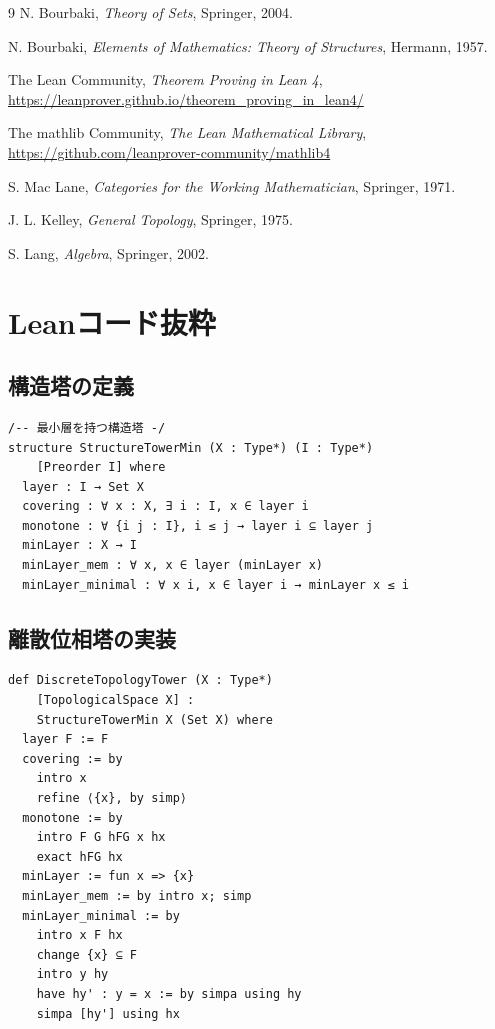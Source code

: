 \documentclass[a4paper,11pt,ja=standard]{bxjsarticle}
\theoremstyle{definition}
\begin{document}
\begin{thebibliography}{9}
N. Bourbaki, \textit{Theory of Sets}, Springer, 2004.

N. Bourbaki, \textit{Elements of Mathematics: Theory of Structures},
Hermann, 1957.

The Lean Community, \textit{Theorem Proving in Lean 4},
\url{https://leanprover.github.io/theorem_proving_in_lean4/}

The mathlib Community, \textit{The Lean Mathematical Library},
\url{https://github.com/leanprover-community/mathlib4}

S. Mac Lane, \textit{Categories for the Working Mathematician},
Springer, 1971.

J. L. Kelley, \textit{General Topology},
Springer, 1975.

S. Lang, \textit{Algebra},
Springer, 2002.
\end{thebibliography}

\appendix
\section{Leanコード抜粋}

\subsection{構造塔の定義}

\begin{lstlisting}[style=leanstyle, caption=構造塔の基本定義]
/-- 最小層を持つ構造塔 -/
structure StructureTowerMin (X : Type*) (I : Type*)
    [Preorder I] where
  layer : I → Set X
  covering : ∀ x : X, ∃ i : I, x ∈ layer i
  monotone : ∀ {i j : I}, i ≤ j → layer i ⊆ layer j
  minLayer : X → I
  minLayer_mem : ∀ x, x ∈ layer (minLayer x)
  minLayer_minimal : ∀ x i, x ∈ layer i → minLayer x ≤ i
\end{lstlisting}

\subsection{離散位相塔の実装}

\begin{lstlisting}[style=leanstyle, caption=離散位相塔]
def DiscreteTopologyTower (X : Type*)
    [TopologicalSpace X] :
    StructureTowerMin X (Set X) where
  layer F := F
  covering := by
    intro x
    refine ⟨{x}, by simp⟩
  monotone := by
    intro F G hFG x hx
    exact hFG hx
  minLayer := fun x => {x}
  minLayer_mem := by intro x; simp
  minLayer_minimal := by
    intro x F hx
    change {x} ⊆ F
    intro y hy
    have hy' : y = x := by simpa using hy
    simpa [hy'] using hx
\end{lstlisting}
\end{document}
